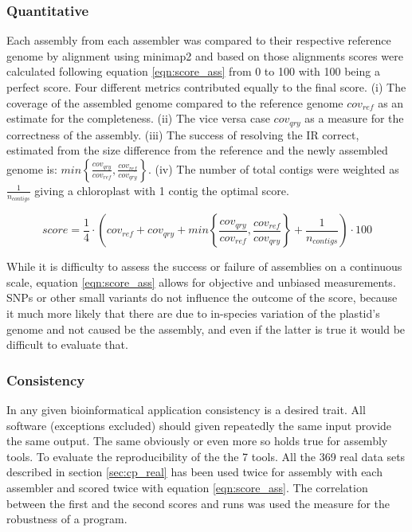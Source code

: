 \subsubsection{Quantitative}

Each assembly from each assembler was compared to their respective reference genome by alignment using
minimap2 \cite{li2018minimap2} and based on those alignments scores were calculated following equation
\ref{eqn:score_ass} from 0 to 100 with 100 being a perfect score. Four different metrics contributed equally
to the final score. (i) The coverage of the assembled genome compared to the reference genome $cov_{ref}$ as
an estimate for the completeness. (ii) The vice versa case $cov_{qry}$ as a measure for the correctness of the
assembly. (iii) The success of resolving the IR correct, estimated from the size difference from the reference
and the newly assembled genome is:
$min\left\{ \frac{cov_{qry}}{cov_{ref}}, \frac{cov_{ref}}{cov_{qry}}\right\}$.  (iv) The number of total
contigs were weighted as $\frac{1}{n_{contigs}}$ giving a chloroplast with 1 contig the optimal score.

\begin{equation}
  score = \frac{1}{4} \cdot \left( cov_{ref} +  cov_{qry} + min\left\{ \frac{cov_{qry}}{cov_{ref}}, \frac{cov_{ref}}{cov_{qry}}\right\} + \frac{1}{n_{contigs} }\right) \cdot 100
  \label{eqn:score_ass}
\end{equation}

While it is difficulty to assess the success or failure of assemblies on a continuous scale, equation
\ref{eqn:score_ass} allows for objective and unbiased measurements. SNPs or other small variants do not
influence the outcome of the score, because it much more likely that there are due to in-species variation of
the plastid's genome and not caused be the assembly, and even if the latter is true it would be difficult to
evaluate that.  
  
\subsubsection{Consistency}

In any given bioinformatical application consistency is a desired trait. All software (exceptions excluded)
should given repeatedly the same input provide the same output. The same obviously or even more so holds true
for assembly tools. To evaluate the reproducibility of the the 7 tools. All the 369 real data sets described
in section \ref{sec:cp_real} has been used twice for assembly with each assembler and scored twice with
equation \ref{eqn:score_ass}. The correlation between the first and the second scores and runs was used the
measure for the robustness of a program.

